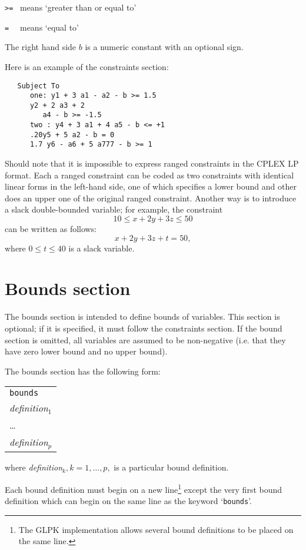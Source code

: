 \verb|>=| \ means `greater than or equal to'

\verb|= | \ means `equal to'

The right hand side $b$ is a numeric constant with an optional sign.

Here is an example of the constraints section:

\begin{verbatim}
   Subject To
      one: y1 + 3 a1 - a2 - b >= 1.5
      y2 + 2 a3 + 2
         a4 - b >= -1.5
      two : y4 + 3 a1 + 4 a5 - b <= +1
      .20y5 + 5 a2 - b = 0
      1.7 y6 - a6 + 5 a777 - b >= 1
\end{verbatim}

Should note that it is impossible to express ranged constraints in the
CPLEX LP format. Each a ranged constraint can be coded as two
constraints with identical linear forms in the left-hand side, one of
which specifies a lower bound and other does an upper one of the
original ranged constraint. Another way is to introduce a slack
double-bounded variable; for example, the
constraint
$$10\leq x+2y+3z\leq 50$$
can be written as follows:
$$x+2y+3z+t=50,$$
where $0\leq t\leq 40$ is a slack variable.

\section{Bounds section}

The bounds section is intended to define bounds of variables. This
section is optional; if it is specified, it must follow the constraints
section. If the bound section is omitted, all variables are assumed to
be non-negative (i.e. that they have zero lower bound and no upper
bound).

The bounds section has the following form:

\begin{center}
\begin{tabular}{l}
\verb|bounds| \\
{\it definition}$_1$ \\
\hspace{20pt}\dots \\
{\it definition}$_p$ \\
\end{tabular}
\end{center}

\noindent
where {\it definition}$_k, k=1,\dots,p,$ is a particular bound
definition.

Each bound definition must begin on a new line\footnote{The GLPK
implementation allows several bound definitions to be placed on the
same line.} except the very first bound definition which can begin on
the same line as the keyword `\verb|bounds|'.

